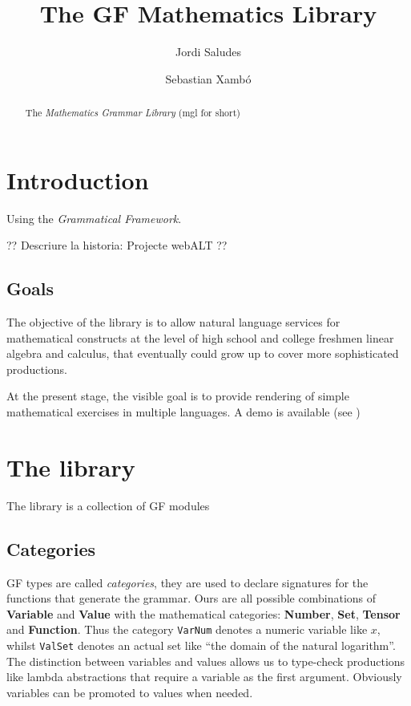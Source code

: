 \documentclass[adraft,copyright,creativecommons]{eptcs}
\title{The GF Mathematics Library}
\author{Jordi Saludes
\institute{UPC}
\institute{Sistemes Avan\c cats de Control}\\
\email{jordi.saludes@upc.edu}
\and
Sebastian Xamb\'o
\institute{Universitat Polit\`ecnica de Catalunya.\\Barcelona, Spain}
\email{\quad ??}
}
\begin{document}
\maketitle

\begin{abstract}
The \emph{Mathematics Grammar Library} (mgl for short)
\end{abstract}

\section{Introduction} %
\label{sec:introduction}

Using the \emph{Grammatical Framework\cite{GF}}.

?? Descriure la historia: Projecte webALT ??

\subsection{Goals} %
\label{sub:goals}
The objective of the library is to allow natural language services for mathematical constructs at the level of high school and
college freshmen linear algebra and calculus, that eventually could grow up to cover more sophisticated productions.

At the present stage, the visible goal is to provide rendering of simple mathematical exercises in multiple languages.
A demo is available (see \cite{MathBar})



\section{The library} %
\label{sec:the_library}
The library is a collection of GF modules

\subsection{Categories} %
\label{sub:categories}

GF types are called \emph{categories}, they are used to declare signatures for the functions that generate the grammar.
Ours are all possible combinations of \textbf{Variable} and \textbf{Value} with the mathematical categories: \textbf{Number}, \textbf{Set}, \textbf{Tensor} and \textbf{Function}.
Thus the category \texttt{VarNum} denotes a numeric variable like $x$, whilst \texttt{ValSet} denotes an actual set like ``the domain of the natural logarithm''.
The distinction between variables and values allows us to type-check productions like lambda abstractions that require a variable as the first argument.
Obviously variables can be promoted to values when needed.
\end{document}
